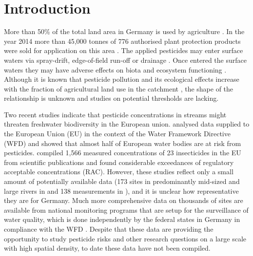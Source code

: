 \documentclass[journal=esthag,manuscript=article]{achemso}
\begin{document}



\section{Introduction}
More than 50\% of the total land area in Germany is used by agriculture \citep{statistisches_bundesamt_bodenflache_2014}.
In the year 2014 more than 45,000 tonnes of 776 authorised plant protection products were sold for application on this area \citep{bundesamt_fur_verbraucherschutz_und_lebensmittelsicherheit_absatz_2015}.
The applied pesticides may enter surface waters via spray-drift, edge-of-field run-off or drainage \citep{stehle_probabilistic_2013,schulz_comparison_2001,liess_determination_1999}.
Once entered the surface waters they may have adverse effects on biota and ecosystem functioning \citep{schafer_thresholds_2012}. 
Although it is known that pesticide pollution and its ecological effects increase with the fraction of agricultural land use in the catchment \citep{schulz_field_2004}, the shape of the relationship is unknown and studies on potential thresholds are lacking.

Two recent studies indicate that pesticide concentrations in streams might threaten freshwater biodiversity in the European union.
\citet{malaj_organic_2014} analysed data supplied to the European Union (EU) in the context of the Water Framework Directive (WFD) and showed that almost half of European water bodies are at risk from pesticides.
\citet{stehle_pesticide_2015} compiled 1,566 measured concentrations of 23 insecticides in the EU from scientific publications and found considerable exceedances of regulatory acceptable concentrations (RAC).
However, these studies reflect only a small amount of potentially available data (173 sites in predominantly mid-sized and large rivers in \citet{malaj_organic_2014} and 138 measurements in \citet{stehle_pesticide_2015}), and it is unclear how representative they are for Germany. %
Much more comprehensive data on thousands of sites are available from national monitoring programs that are setup for the surveillance of water quality,
which is done independently by the federal states in Germany in compliance with the WFD \citep{quevauviller_water_2008}. 
Despite that these data are providing the opportunity to study pesticide risks and other research questions on a large scale with high spatial density, to date these data have not been compiled.
\end{document}
